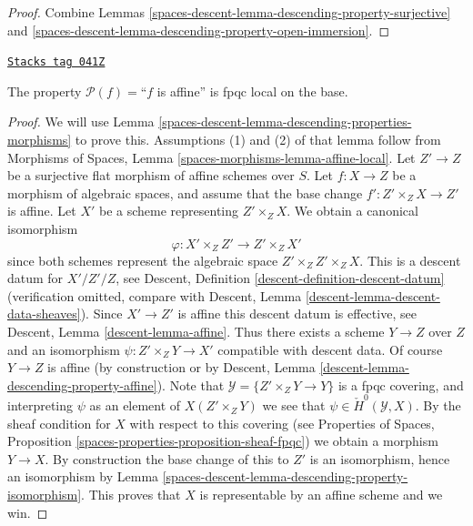 \begin{proof}
Combine Lemmas \ref{spaces-descent-lemma-descending-property-surjective}
and \ref{spaces-descent-lemma-descending-property-open-immersion}.
\end{proof}

\begin{lemma}
\label{spaces-descent-lemma-descending-property-affine}
\href{https://stacks.math.columbia.edu/tag/041Z}{\texttt{Stacks tag 041Z}}

The property $\mathcal{P}(f) =$``$f$ is affine''
is fpqc local on the base.
\end{lemma}

\begin{proof}
We will use
Lemma \ref{spaces-descent-lemma-descending-properties-morphisms}
to prove this. Assumptions (1) and (2) of that lemma follow from
Morphisms of Spaces,
Lemma \ref{spaces-morphisms-lemma-affine-local}.
Let $Z' \to Z$ be a surjective flat morphism of affine schemes over $S$.
Let $f : X \to Z$ be a morphism of algebraic spaces, and assume
that the base change $f' : Z' \times_Z X \to Z'$ is affine.
Let $X'$ be a scheme representing $Z' \times_Z X$.
We obtain a canonical isomorphism
$$
\varphi : X' \times_Z Z' \longrightarrow Z' \times_Z X'
$$
since both schemes represent the algebraic space $Z' \times_Z Z' \times_Z X$.
This is a descent datum for $X'/Z'/Z$, see
Descent, Definition \ref{descent-definition-descent-datum}
(verification omitted, compare with
Descent, Lemma \ref{descent-lemma-descent-data-sheaves}).
Since $X' \to Z'$ is affine this descent datum is effective, see
Descent, Lemma \ref{descent-lemma-affine}.
Thus there exists a scheme $Y \to Z$ over $Z$ and an
isomorphism $\psi : Z' \times_Z Y \to X'$ compatible with descent data.
Of course $Y \to Z$ is affine (by construction or by
Descent, Lemma \ref{descent-lemma-descending-property-affine}).
Note that $\mathcal{Y} = \{Z' \times_Z Y \to Y\}$ is a
fpqc covering, and interpreting $\psi$ as an element of
$X(Z' \times_Z Y)$ we see that $\psi \in \check{H}^0(\mathcal{Y}, X)$.
By the sheaf condition for $X$ with respect to this covering (see
Properties of Spaces, Proposition
\ref{spaces-properties-proposition-sheaf-fpqc})
we obtain a morphism $Y \to X$.
By construction the base change of this to $Z'$ is an isomorphism, hence
an isomorphism by
Lemma \ref{spaces-descent-lemma-descending-property-isomorphism}.
This proves that $X$ is representable by an affine scheme and we win.
\end{proof}


